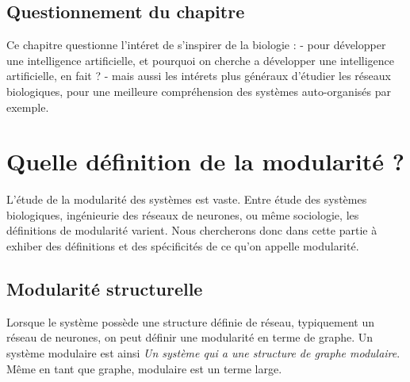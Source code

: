 \subsection{Questionnement du chapitre}

Ce chapitre questionne l'intéret de s'inspirer de la biologie : 
- pour développer une intelligence artificielle, et pourquoi on cherche a développer une intelligence artificielle, en fait ? 
- mais aussi les intérets plus généraux d'étudier les réseaux biologiques, pour une meilleure compréhension des systèmes auto-organisés par exemple. 


\section{Quelle définition de la modularité ?}

L'étude de la modularité des systèmes est vaste. Entre étude des systèmes biologiques, ingénieurie des réseaux de neurones, ou même sociologie, les définitions de modularité varient. Nous chercherons donc dans cette partie à exhiber des définitions et des spécificités de ce qu'on appelle modularité.

\subsection{Modularité structurelle}

Lorsque le système possède une structure définie de réseau, typiquement un réseau de neurones, on peut définir une modularité en terme de graphe. Un système modulaire est ainsi \emph{Un système qui a une structure de graphe modulaire}.
Même en tant que graphe, modulaire est un terme large. 

